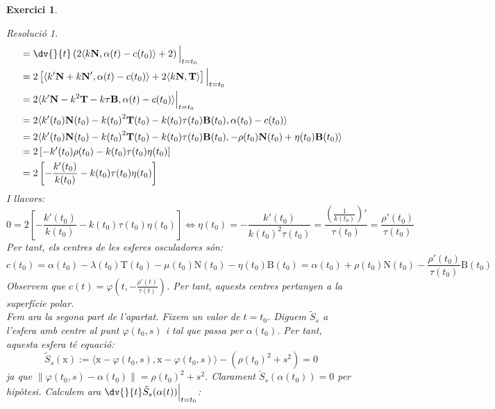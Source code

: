 \documentclass[10pt,a4paper]{article}
\newcommand{\vf}[1]{\boldsymbol{\mathrm{#1}}} %
\newtheorem{exercice}{Exercici}
\theoremstyle{remark}
\newtheorem*{resolution}{Resolució}
\theoremstyle{math}
\begin{document}
\begin{exercice}
\begin{enumerate}
\begin{resolution}
\begin{align*}
                & =\dv{}{t}\left(2\langle k\vf{N},\alpha(t)-c(t_0)\rangle+2\right)\Big|_{t=t_0}                                                   \\
                & =2\left[\langle k'\vf{N}+k\vf{N}',\alpha(t)-c(t_0)\rangle+2\langle k\vf{N},\vf{T}\rangle\right]\Big|_{t=t_0}                    \\
                & =2\langle k'\vf{N}-k^2\vf{T}-k\tau\vf{B},\alpha(t)-c(t_0)\rangle\Big|_{t=t_0}                                                   \\
                & =2\langle k'(t_0)\vf{N}(t_0)-{k(t_0)}^2\vf{T}(t_0)-k(t_0)\tau(t_0)\vf{B}(t_0),\alpha(t_0)-c(t_0)\rangle                         \\
                & =2\langle k'(t_0)\vf{N}(t_0)-{k(t_0)}^2\vf{T}(t_0)-k(t_0)\tau(t_0)\vf{B}(t_0),-\rho(t_0)\vf{N}(t_0)+\eta(t_0)\vf{B}(t_0)\rangle \\
                & =2\left[-k'(t_0)\rho(t_0)-k(t_0)\tau(t_0)\eta(t_0)\right]                                                                       \\
                & =2\left[-\frac{k'(t_0)}{k(t_0)}-k(t_0)\tau(t_0)\eta(t_0)\right]
            \end{align*}
            I llavors: $$0=2\left[-\frac{k'(t_0)}{k(t_0)}-k(t_0)\tau(t_0)\eta(t_0)\right]\iff \eta(t_0)=-\frac{k'(t_0)}{{k(t_0)}^2\tau(t_0)}=\frac{{\left(\frac{1}{k(t_0)}\right)}'}{\tau(t_0)}=\frac{\rho'(t_0)}{\tau(t_0)}$$
            Per tant, els centres de les esferes osculadores són:
            \begin{equation}\label{centres}
              c(t_0)=\alpha(t_0)-\lambda(t_0)\vf{T}(t_0)-\mu(t_0)\vf{N}(t_0)-\eta(t_0)\vf{B}(t_0)=\alpha(t_0)+\rho(t_0)\vf{N}(t_0)-\frac{\rho'(t_0)}{\tau(t_0)}\vf{B}(t_0)
            \end{equation}
            Observem que $c(t)=\varphi\left(t,-\frac{\rho'(t)}{\tau(t)}\right)$. Per tant, aquests centres pertanyen a la superfície polar.\\
            Fem ara la segona part de l'apartat. Fixem un valor de $t=t_0$. Diguem $\tilde{S}_s$ a l'esfera amb centre al punt $\varphi(t_0,s)$ i tal que passa per $\alpha(t_0)$. Per tant, aquesta esfera té equació: $$\tilde{S}_s(\vf{x}):=\langle\vf{x}-\varphi(t_0,s),\vf{x}-\varphi(t_0,s)\rangle-(\rho(t_0)^2+s^2)=0$$
            ja que $\|\varphi(t_0,s)-\alpha(t_0)\|=\rho(t_0)^2+s^2$. Clarament $\tilde{S}_s(\alpha(t_0))=0$ per hipòtesi.
            Calculem ara $\dv{}{t}\tilde{S}_s(\alpha(t))\Big|_{t=t_0}$:
            \begin{align*}

\end{align*}
\end{resolution}
\end{enumerate}
\end{exercice}
\end{document}
